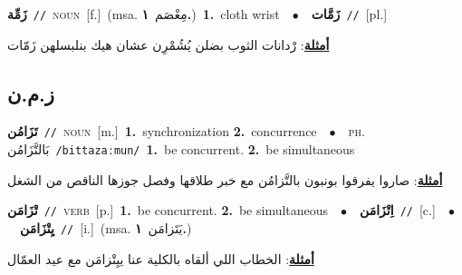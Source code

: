 \documentclass[10pt,a4paper,twoside]{article} %
\begin{document}
\begin{multicols}{2}
{\setlength\topsep{0pt}\textbf{\foreignlanguage{arabic}{زَمِّة}}\ {\color{gray}\texttt{//}\color{black}}\ \textsc{noun}\ [f.]\ \color{gray}(msa. \foreignlanguage{arabic}{مِعْصَم}~\foreignlanguage{arabic}{\textbf{١.}})\color{black}\ \textbf{1.}~cloth wrist\ \ $\bullet$\ \ \setlength\topsep{0pt}\textbf{\foreignlanguage{arabic}{زَمَّات}}\ {\color{gray}\texttt{//}\color{black}}\ [pl.]\  \begin{flushright}\color{gray}\foreignlanguage{arabic}{\textbf{\underline{\foreignlanguage{arabic}{أمثلة}}}: رْدانات الثوب بضلن يُشُمْرِن عشان هيك بنلبسلهن زَمّات}\end{flushright}\color{black}} \vspace{2mm}

\vspace{-3mm}
\subsection*{\color{blue}\foreignlanguage{arabic}{ز.م.ن}\color{blue}{}} 

{\setlength\topsep{0pt}\textbf{\foreignlanguage{arabic}{تَزَامُن}}\ {\color{gray}\texttt{//}\color{black}}\ \textsc{noun}\ [m.]\ \textbf{1.}~synchronization  \textbf{2.}~concurrence\ \ $\bullet$\ \ \textsc{ph.} \color{gray} \foreignlanguage{arabic}{بَالتَّزَامُن}\color{black}\ {\color{gray}\texttt{/{\sffamily bittazaːmun}/}\color{black}}\ \textbf{1.}~be concurrent.  \textbf{2.}~be simultaneous\  \begin{flushright}\color{gray}\foreignlanguage{arabic}{\textbf{\underline{\foreignlanguage{arabic}{أمثلة}}}: صاروا يفرقوا بونبون بالتَّزامُن مع خبر طلاقها وفصل جوزها الناقص من الشغل}\end{flushright}\color{black}} \vspace{2mm}

{\setlength\topsep{0pt}\textbf{\foreignlanguage{arabic}{تْزَامَن}}\ {\color{gray}\texttt{//}\color{black}}\ \textsc{verb}\ [p.]\ \textbf{1.}~be concurrent.  \textbf{2.}~be simultaneous\ \ $\bullet$\ \ \setlength\topsep{0pt}\textbf{\foreignlanguage{arabic}{اِتْزَامَن}}\ {\color{gray}\texttt{//}\color{black}}\ [c.]\ \ $\bullet$\ \ \setlength\topsep{0pt}\textbf{\foreignlanguage{arabic}{يِتْزَامَن}}\ {\color{gray}\texttt{//}\color{black}}\ [i.]\ \color{gray}(msa. \foreignlanguage{arabic}{يَتَزامَن}~\foreignlanguage{arabic}{\textbf{١.}})\color{black}\  \begin{flushright}\color{gray}\foreignlanguage{arabic}{\textbf{\underline{\foreignlanguage{arabic}{أمثلة}}}: الخطاب اللي ألقاه بالكلية عنا ييِتْزامَن مع عيد العمّال}\end{flushright}\color{black}} \vspace{2mm}


\end{multicols}
\end{document}
